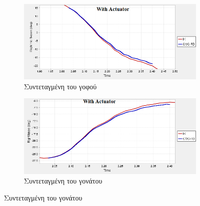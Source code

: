 \begin{figure}[H]
    \centering
    \begin{subfigure}[t]{.48\textwidth}
        \includegraphics[width=\textwidth, keepaspectratio]{fig/hip-ik-cmc.png}
        \caption{Συντεταγμένη του γοφού}
        \label{fig:hip-cmc}
    \end{subfigure}
    \begin{subfigure}[t]{.48\textwidth}
        \includegraphics[width=\textwidth, keepaspectratio]{fig/knee-ik-cmc.png}
        \caption{Συντεταγμένη του γονάτου}
        \label{fig:knee-cmc}
    \end{subfigure}


\end{figure}
